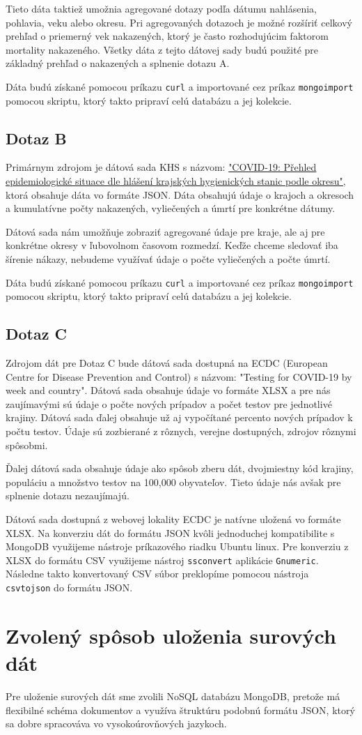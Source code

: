 \documentclass[11pt, a4paper]{article}
\begin{document}
\hfill \break
Tieto dáta taktiež umožnia agregované dotazy podľa dátumu nahlásenia, pohlavia, veku alebo okresu. Pri agregovaných dotazoch je možné rozšíriť celkový prehľad o priemerný vek nakazených, ktorý je často rozhodujúcim faktorom mortality nakazeného. Všetky dáta z tejto dátovej sady budú použité pre základný prehľad o nakazených a splnenie dotazu A.

\hfill \break
Dáta budú získané pomocou príkazu \texttt{curl} a importované cez príkaz \texttt{mongoimport} pomocou skriptu, ktorý takto pripraví celú databázu a jej kolekcie.
\subsection*{Dotaz B}
Primárnym zdrojom je dátová sada KHS s názvom: \href{https://onemocneni-aktualne.mzcr.cz/api/v2/covid-19}{"COVID-19: Přehled epidemiologické situace dle hlášení krajských hygienických stanic podle okresu"}, ktorá obsahuje dáta vo formáte JSON. Dáta obsahujú údaje o krajoch a okresoch a kumulatívne počty nakazených, vyliečených a úmrtí pre konkrétne dátumy.

\hfill \break
Dátová sada nám umožňuje zobraziť agregované údaje pre kraje, ale aj pre konkrétne okresy v ľubovolnom časovom rozmedzí. Keďže chceme sledovať iba šírenie nákazy, nebudeme využívať údaje o počte vyliečených a počte úmrtí.

\hfill \break
Dáta budú získané pomocou príkazu \texttt{curl} a importované cez príkaz \texttt{mongoimport} pomocou skriptu, ktorý takto pripraví celú databázu a jej kolekcie.

\subsection*{Dotaz C}
Zdrojom dát pre Dotaz C bude dátová sada dostupná na ECDC (European Centre for Disease Prevention and Control) s názvom: "Testing for COVID-19 by week and country". Dátová sada obsahuje údaje vo formáte XLSX a pre nás zaujímavými sú údaje o počte nových prípadov a počet testov pre jednotlivé krajiny. Dátová sada ďalej obsahuje už aj vypočítané percento nových prípadov k počtu testov. Údaje sú zozbierané z rôznych, verejne dostupných, zdrojov rôznymi spôsobmi. 

\hfill \break
Ďalej dátová sada obsahuje údaje ako spôsob zberu dát, dvojmiestny kód krajiny, populáciu a množstvo testov na 100,000 obyvateľov. Tieto údaje nás avšak pre splnenie dotazu nezaujímajú.

\hfill \break
Dátová sada dostupná z webovej lokality ECDC je natívne uložená vo formáte XLSX. Na konverziu dát do formátu JSON kvôli jednoduchej kompatibilite s MongoDB využijeme nástroje príkazového riadku Ubuntu linux. Pre konverziu z XLSX do formátu CSV využijeme nástroj \texttt{ssconvert} aplikácie \texttt{Gnumeric}. Následne takto konvertovaný CSV súbor preklopíme pomocou nástroja \texttt{csvtojson} do formátu JSON.

\section*{Zvolený spôsob uloženia surových dát}
Pre uloženie surových dát sme zvolili NoSQL databázu MongoDB, pretože má flexibilné schéma dokumentov a využíva štruktúru podobnú formátu JSON, ktorý sa dobre spracováva vo vysokoúrovňových jazykoch.
\end{document}
